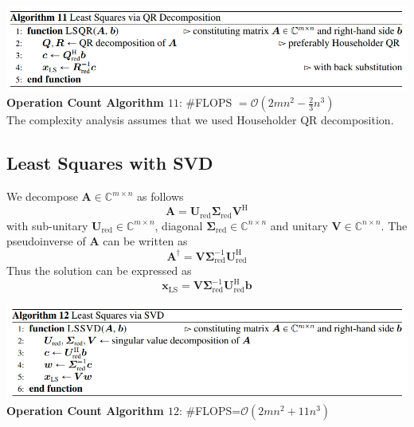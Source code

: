 \documentclass[english]{latex4ei/latex4ei_sheet}
\begin{document}
\begin{sectionbox}
    \includegraphics[width=\textwidth]{img/algo11_ls_with_QR.png}\\
    \textbf{Operation Count Algorithm $11$}: \#FLOPS $=\mathcal{O}(2mn^2-\frac{2}{3}n^3)$\\
    The complexity analysis assumes that we used Householder QR decomposition.
\end{sectionbox}
\begin{sectionbox}
    \subsection{Least Squares with SVD}
    We decompose $\mathbf{A}\in\mathbb{C}^{m\times n}$ as follows
    $$\mathbf{A}=\mathbf{U}_{\text{red}}\mathbf{\Sigma}_{\text{red}}\mathbf{V}^\text{H}$$
    with sub-unitary $\mathbf{U}_{\text{red}}\in\mathbb{C}^{m\times n}$, diagonal $\mathbf{\Sigma}_{\text{red}} \in\mathbb{C}^{n\times n}$ and unitary $\mathbf{V} \in\mathbb{C}^{n\times n}$. The pseudoinverse of $\mathbf{A}$ can be written as
    $$\mathbf{A}^\dagger = \mathbf{V}\mathbf{\Sigma}^{-1}_{\text{red}}\mathbf{U}^\text{H}_{\text{red}}$$
    Thus the solution can be expressed as
    $$\mathbf{x}_{\text{LS}} = \mathbf{V}\mathbf{\Sigma}^{-1}_{\text{red}}\mathbf{U}^\text{H}_{\text{red}}\mathbf{b}$$

\end{sectionbox}
\begin{sectionbox}
    \includegraphics[width=\textwidth]{img/algo12_ls_with_SVD.png}\\
    \textbf{Operation Count Algorithm $12$}: \#FLOPS=$\mathcal{O}(2mn^2+11n^3)$
\end{sectionbox}
\end{document}

